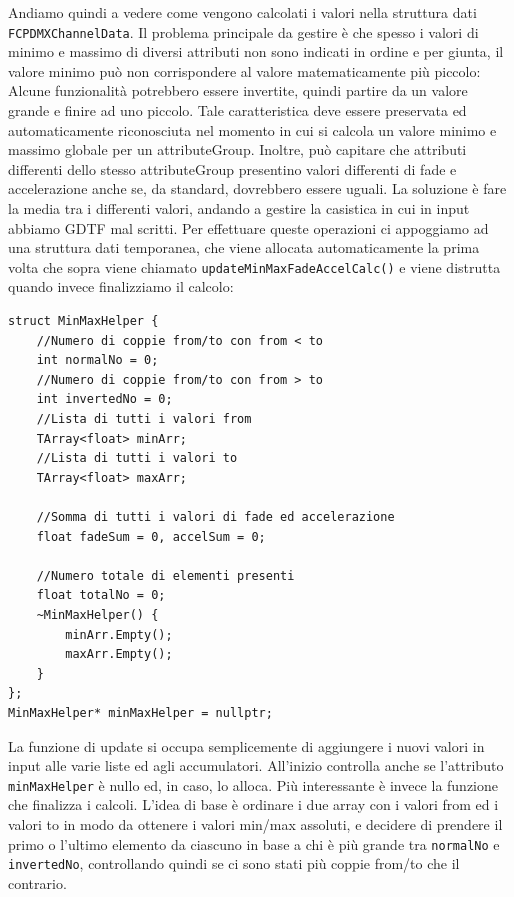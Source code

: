 \documentclass[main.tex]{subfiles}
\begin{document}
%
Andiamo quindi a vedere come vengono calcolati i valori nella struttura dati \lstinline{FCPDMXChannelData}. Il problema principale da gestire è che spesso i valori di minimo e massimo di diversi attributi non sono indicati in ordine e per giunta, il valore minimo può non corrispondere al valore matematicamente più piccolo: Alcune funzionalità potrebbero essere invertite, quindi partire da un valore grande e finire ad uno piccolo. Tale caratteristica deve essere preservata ed automaticamente riconosciuta nel momento in cui si calcola un valore minimo e massimo globale per un attributeGroup. Inoltre, può capitare che attributi differenti dello stesso attributeGroup presentino valori differenti di fade e accelerazione anche se, da standard, dovrebbero essere uguali. La soluzione è fare la media tra i differenti valori, andando a gestire la casistica in cui in input abbiamo GDTF mal scritti. Per effettuare queste operazioni ci appoggiamo ad una struttura dati temporanea, che viene allocata automaticamente la prima volta che sopra viene chiamato \lstinline{updateMinMaxFadeAccelCalc()} e viene distrutta quando invece finalizziamo il calcolo:
\begin{lstlisting}
struct MinMaxHelper {
    //Numero di coppie from/to con from < to
    int normalNo = 0;
    //Numero di coppie from/to con from > to
    int invertedNo = 0;
    //Lista di tutti i valori from
    TArray<float> minArr;
    //Lista di tutti i valori to
    TArray<float> maxArr;

    //Somma di tutti i valori di fade ed accelerazione
    float fadeSum = 0, accelSum = 0;

    //Numero totale di elementi presenti
    float totalNo = 0;
    ~MinMaxHelper() {
        minArr.Empty();
        maxArr.Empty();
    }
};
MinMaxHelper* minMaxHelper = nullptr;
\end{lstlisting}
La funzione di update si occupa semplicemente di aggiungere i nuovi valori in input alle varie liste ed agli accumulatori. All'inizio controlla anche se l'attributo \lstinline{minMaxHelper} è nullo ed, in caso, lo alloca. Più interessante è invece la funzione che finalizza i calcoli. L'idea di base è ordinare i due array con i valori from ed i valori to in modo da ottenere i valori min/max assoluti, e decidere di prendere il primo o l'ultimo elemento da ciascuno in base a chi è più grande tra \lstinline{normalNo} e \lstinline{invertedNo}, controllando quindi se ci sono stati più coppie from/to  che il contrario.
\end{document}
